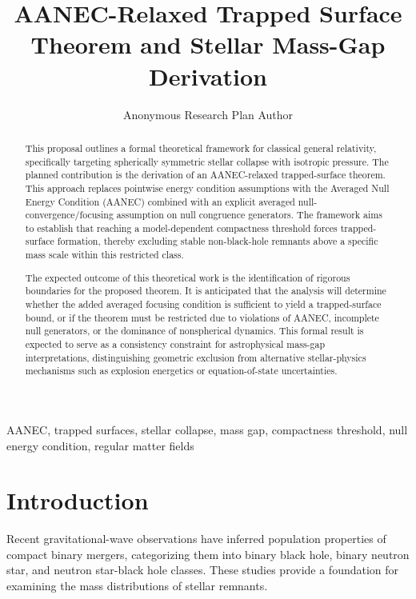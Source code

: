 \documentclass[conference]{IEEEtran}
\begin{document}
\title{AANEC-Relaxed Trapped Surface Theorem and Stellar Mass-Gap Derivation}\author{Anonymous Research Plan Author}\maketitle

\begin{abstract}
This proposal outlines a formal theoretical framework for classical general relativity, specifically targeting spherically symmetric stellar collapse with isotropic pressure. The planned contribution is the derivation of an AANEC-relaxed trapped-surface theorem. This approach replaces pointwise energy condition assumptions with the Averaged Null Energy Condition (AANEC) combined with an explicit averaged null-convergence/focusing assumption on null congruence generators. The framework aims to establish that reaching a model-dependent compactness threshold forces trapped-surface formation, thereby excluding stable non-black-hole remnants above a specific mass scale within this restricted class.

The expected outcome of this theoretical work is the identification of rigorous boundaries for the proposed theorem. It is anticipated that the analysis will determine whether the added averaged focusing condition is sufficient to yield a trapped-surface bound, or if the theorem must be restricted due to violations of AANEC, incomplete null generators, or the dominance of nonspherical dynamics. This formal result is expected to serve as a consistency constraint for astrophysical mass-gap interpretations, distinguishing geometric exclusion from alternative stellar-physics mechanisms such as explosion energetics or equation-of-state uncertainties.
\end{abstract}
\begin{IEEEkeywords}
AANEC, trapped surfaces, stellar collapse, mass gap, compactness threshold, null energy condition, regular matter fields
\end{IEEEkeywords}\section{Introduction}
Recent gravitational-wave observations have inferred population properties of compact binary mergers, categorizing them into binary black hole, binary neutron star, and neutron star-black hole classes. These studies provide a foundation for examining the mass distributions of stellar remnants.~\cite{cite_fd0f77b2a173c0ab}
\end{document}
